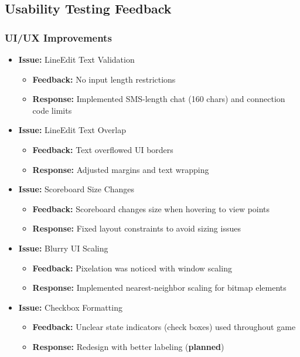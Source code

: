 \documentclass{article}
\begin{document}
\subsection{Usability Testing Feedback}

\subsubsection{UI/UX Improvements}
\begin{itemize}
    \item \textbf{Issue:} LineEdit Text Validation
    \begin{itemize}
        \item \textbf{Feedback:} No input length restrictions
        \item \textbf{Response:} Implemented SMS-length chat (160 chars) and connection code limits
    \end{itemize}
    
    \item \textbf{Issue:} LineEdit Text Overlap
    \begin{itemize}
        \item \textbf{Feedback:} Text overflowed UI borders
        \item \textbf{Response:} Adjusted margins and text wrapping
    \end{itemize}
    
    \item \textbf{Issue:} Scoreboard Size Changes
    \begin{itemize}
        \item \textbf{Feedback:} Scoreboard changes size when hovering to view points
        \item \textbf{Response:} Fixed layout constraints to avoid sizing issues
    \end{itemize}
    
    \item \textbf{Issue:} Blurry UI Scaling
    \begin{itemize}
        \item \textbf{Feedback:} Pixelation was noticed with window scaling
        \item \textbf{Response:} Implemented nearest-neighbor scaling for bitmap elements
    \end{itemize}
    
    \item \textbf{Issue:} Checkbox Formatting
    \begin{itemize}
        \item \textbf{Feedback:} Unclear state indicators (check boxes) used throughout game
        \item \textbf{Response:} Redesign with better labeling (\textbf{planned})
    \end{itemize}
\end{itemize}
\end{document}
